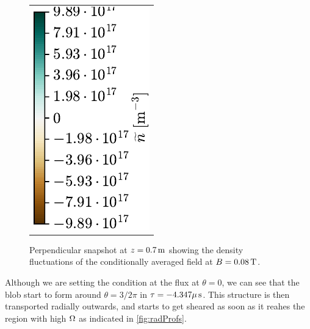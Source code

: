 \begin{figure}[h!]
\begin{tabular}{ccc}
  \multicolumn{3}{c}{\hspace*{2cm}\includegraphics[angle=-90]{fig/results/blobs/matrix-perp-blobs-B0_0.08-fluct/colorbar}}
  \\
\end{tabular}
\caption{Perpendicular snapshot at $z=0.7\, \text{m}$ showing the density fluctuations of the conditionally averaged field at $B=0.08\, \text{T}$.}
\label{fig:perpBlob008}
\end{figure}
%
Although we are setting the condition at the flux at $\theta = 0$, we can see that the blob start to form around $\theta = 3/2 \pi$ in $\tau=-4.347\mu \, \text{s}$.
This structure is then transported radially outwards, and starts to get sheared as soon as it reahes the region with high $\Omega$ as indicated in \cref{fig:radProfs}.



